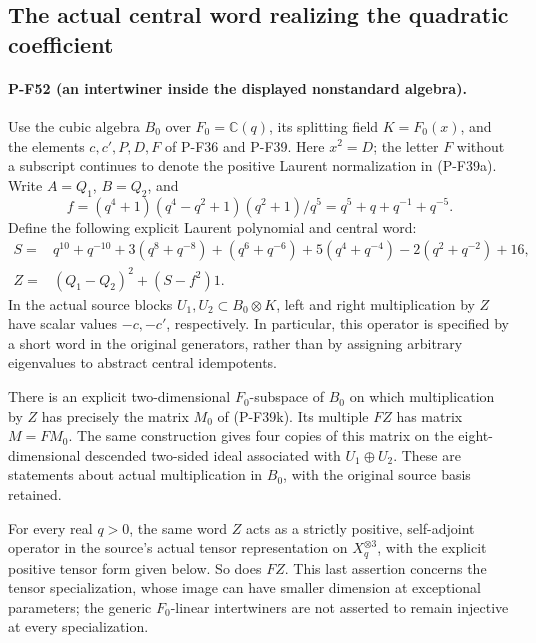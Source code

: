 \subsection{The actual central word realizing the quadratic coefficient}
\label{sec:nonstandard-central-word}

\paragraph{P-F52 (an intertwiner inside the displayed nonstandard algebra).}
Use the cubic algebra $B_0$ over $F_0=\mathbb C(q)$, its splitting
field $K=F_0(x)$, and the elements $c,c',P,D,F$ of P-F36 and P-F39.
Here $x^2=D$; the letter $F$ without a subscript continues to denote
the positive Laurent normalization in (P-F39a).
Write $A=Q_1$, $B=Q_2$, and
\[
 f=(q^4+1)(q^4-q^2+1)(q^2+1)/q^5
   =q^5+q+q^{-1}+q^{-5}.
\]
Define the following explicit Laurent polynomial and central word:
\[
 \begin{split}
 S={}&q^{10}+q^{-10}+3(q^8+q^{-8})+(q^6+q^{-6})
       +5(q^4+q^{-4})-2(q^2+q^{-2})+16,\\
 Z={}&(Q_1-Q_2)^2+(S-f^2)1.
 \end{split}                                                    \tag{P-F52a}
\]
In the actual source blocks $U_1,U_2\subset B_0\otimes K$,
left and right multiplication by $Z$ have scalar values $-c,-c'$,
respectively. In particular, this operator is specified by a short
word in the original generators, rather than by assigning arbitrary
eigenvalues to abstract central idempotents.

There is an explicit two-dimensional $F_0$-subspace of $B_0$ on
which multiplication by $Z$ has precisely the matrix $M_0$ of
(P-F39k). Its multiple $FZ$ has matrix $M=FM_0$.
The same construction gives four copies of this matrix on the
eight-dimensional descended two-sided ideal associated with
$U_1\oplus U_2$. These are statements about actual multiplication
in $B_0$, with the original source basis retained.

For every real $q>0$, the same word $Z$ acts as a strictly positive,
self-adjoint operator in the source's actual tensor representation
on $X_q^{\otimes3}$, with the explicit positive tensor form given
below. So does $FZ$. This last assertion concerns the tensor
specialization, whose image can have smaller dimension at exceptional
parameters; the generic $F_0$-linear intertwiners are not asserted to
remain injective at every specialization.

